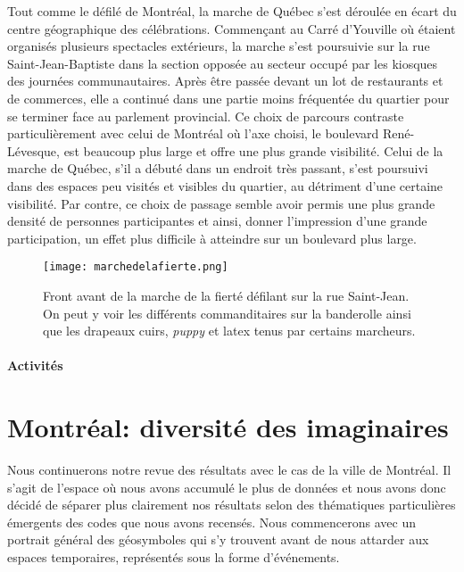 Tout comme le défilé de Montréal, la marche de Québec s'est déroulée en écart du centre géographique des célébrations.
Commençant au Carré d'Youville où étaient organisés plusieurs spectacles extérieurs, la marche s'est poursuivie sur la rue Saint-Jean-Baptiste dans la section opposée au secteur occupé par les kiosques des journées communautaires.
Après être passée devant un lot de restaurants et de commerces, elle a continué dans une partie moins fréquentée du quartier pour se terminer face au parlement provincial.
Ce choix de parcours contraste particulièrement avec celui de Montréal où l'axe choisi, le boulevard René-Lévesque, est beaucoup plus large et offre une plus grande visibilité.
Celui de la marche de Québec, s'il a débuté dans un endroit très passant, s'est poursuivi dans des espaces peu visités et visibles du quartier, au détriment d'une certaine visibilité.
Par contre, ce choix de passage semble avoir permis une plus grande densité de personnes participantes et ainsi, donner l'impression d'une grande participation, un effet plus difficile à atteindre sur un boulevard plus large.

\begin{figure}[ht]
\centering
\texttt{[image: marchedelafierte.png]}\caption[Marche de la fierté]{Front avant de la marche de la fierté défilant sur la rue Saint-Jean. On peut y voir les différents commanditaires sur la banderolle ainsi que les drapeaux cuirs, \emph{puppy} et latex tenus par certains marcheurs.\label{fig:marchedelafierte}}
\end{figure}

\paragraph{Activités}
\label{subsec:activitesfiertemontreal}


\section{Montréal: diversité des imaginaires}
\label{sec:montr_al_diversit_des_imaginaires}
Nous continuerons notre revue des résultats avec le cas de la ville de Montréal.
Il s'agit de l'espace où nous avons accumulé le plus de données et nous avons donc décidé de séparer plus clairement nos résultats selon des thématiques particulières émergents des codes que nous avons recensés.
Nous commencerons avec un portrait général des géosymboles qui s'y trouvent avant de nous attarder aux espaces temporaires, représentés sous la forme d'événements.

